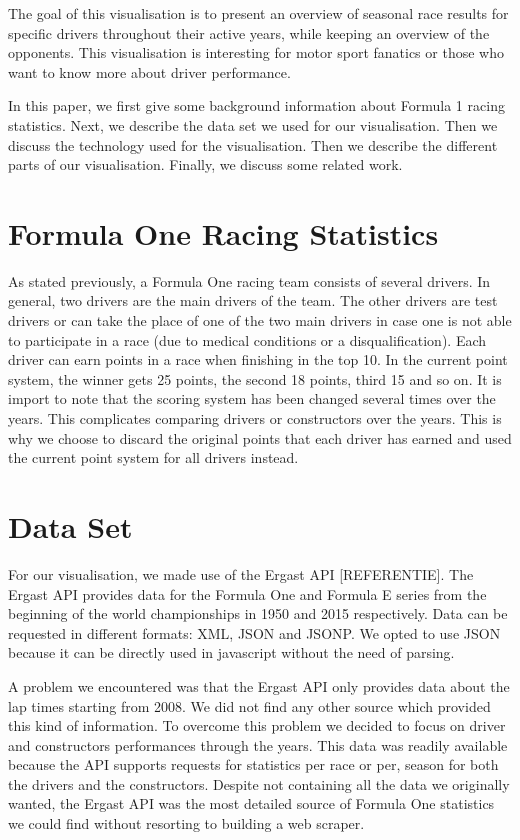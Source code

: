 \documentclass{sigchi}
\begin{document}
The goal of this visualisation is to present an overview of seasonal race results for specific drivers throughout their active years, while keeping an overview of the opponents. This visualisation is interesting for motor sport fanatics or those who want to know more about driver performance.
 
In this paper, we first give some background information about Formula 1 racing statistics. Next, we describe the data set we used for our visualisation. Then we discuss the technology used for the visualisation. Then we describe the different parts of our visualisation. Finally, we discuss some related work. 



\section{Formula One Racing Statistics}

As stated previously, a Formula One racing team consists of several drivers. In general, two drivers are the main drivers of the team. The other drivers are test drivers or can take the place of one of the two main drivers in case one is not able to participate in a race (due to medical conditions or a disqualification). Each driver can earn points in a race when finishing in the top 10. In the current point system, the winner gets 25 points, the second 18 points, third 15 and so on. It is import to note that the scoring system has been changed several times over the years. This complicates comparing drivers or constructors over the years. This is why we choose to discard the original points that each driver has earned and used the current point system for all drivers instead.


\section{Data Set}
For our visualisation, we made use of the Ergast API [REFERENTIE]. The Ergast API provides data for the Formula One and Formula E series from the beginning of the world championships in 1950 and 2015 respectively. Data can be requested in different formats: XML, JSON and JSONP. We opted to use JSON because it can be directly used in javascript without the need of parsing. 

A problem we encountered was that the Ergast API only provides data about the lap times starting from 2008. We did not find any other source which provided this kind of information. To overcome this problem we decided to focus on driver and constructors performances through the years. This data was readily available because the API supports requests for statistics per race or per, season for both the drivers and the constructors. Despite not containing all the data we originally wanted, the Ergast API was the most detailed source of Formula One statistics we could find without resorting to building  a web scraper. 
\end{document}
